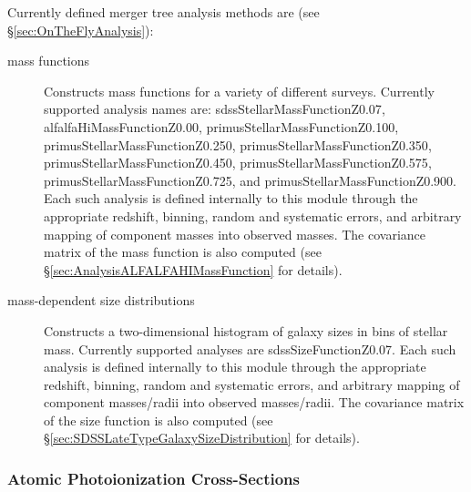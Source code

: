Currently defined merger tree analysis methods are (see \S\ref{sec:OnTheFlyAnalysis}):
\begin{description}
 \item [mass functions] Constructs mass functions for a variety of different surveys. Currently supported analysis names are: {\normalfont \ttfamily sdssStellarMassFunctionZ0.07}, {\normalfont \ttfamily alfalfaHiMassFunctionZ0.00}, {\normalfont \ttfamily primusStellarMassFunctionZ0.100}, {\normalfont \ttfamily primusStellarMassFunctionZ0.250}, {\normalfont \ttfamily primusStellarMassFunctionZ0.350}, {\normalfont \ttfamily primusStellarMassFunctionZ0.450}, {\normalfont \ttfamily primusStellarMassFunctionZ0.575}, {\normalfont \ttfamily primusStellarMassFunctionZ0.725}, and {\normalfont \ttfamily primusStellarMassFunctionZ0.900}. Each such analysis is defined internally to this module through the appropriate redshift, binning, random and systematic errors, and arbitrary mapping of component masses into observed masses. The covariance matrix of the mass function is also computed (see \S\ref{sec:AnalysisALFALFAHIMassFunction} for details).
 \item [mass-dependent size distributions] Constructs a two-dimensional histogram of galaxy sizes in bins of stellar mass. Currently supported analyses are {\normalfont \ttfamily sdssSizeFunctionZ0.07}. Each such analysis is defined internally to this module through the appropriate redshift, binning, random and systematic errors, and arbitrary mapping of component masses/radii into observed masses/radii. The covariance matrix of the size function is also computed (see \S\ref{sec:SDSSLateTypeGalaxySizeDistribution} for details).
\end{description}

\subsubsection{Atomic Photoionization Cross-Sections}

